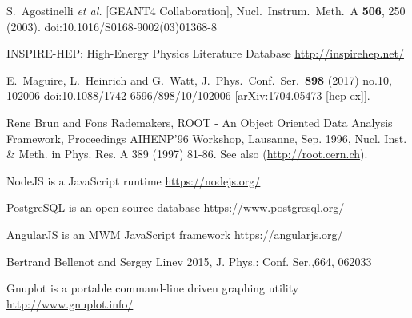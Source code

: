 \begin{thebibliography}{}
%
%
S.~Agostinelli {\it et al.} [GEANT4 Collaboration],
  Nucl.\ Instrum.\ Meth.\ A {\bf 506}, 250 (2003).
  doi:10.1016/S0168-9002(03)01368-8

INSPIRE-HEP: High-Energy Physics Literature Database \url{http://inspirehep.net/}

  E.~Maguire, L.~Heinrich and G.~Watt,
  J.\ Phys.\ Conf.\ Ser.\  {\bf 898} (2017) no.10,  102006
  doi:10.1088/1742-6596/898/10/102006
  [arXiv:1704.05473 [hep-ex]].

    Rene Brun and Fons Rademakers,
    ROOT - An Object Oriented Data Analysis Framework,
    Proceedings AIHENP'96 Workshop, Lausanne, Sep. 1996, Nucl. Inst. \& Meth. in Phys. Res. A 389 (1997) 81-86. See also (\url{http://root.cern.ch}).

NodeJS is a JavaScript runtime \url{https://nodejs.org/}

PostgreSQL is an open-source database \url{https://www.postgresql.org/}

AngularJS is an MWM JavaScript framework \url{https://angularjs.org/}

Bertrand Bellenot and Sergey Linev 2015, J. Phys.: Conf. Ser.,664,  062033

Gnuplot is a portable command-line driven graphing utility \url{http://www.gnuplot.info/}

\end{thebibliography}